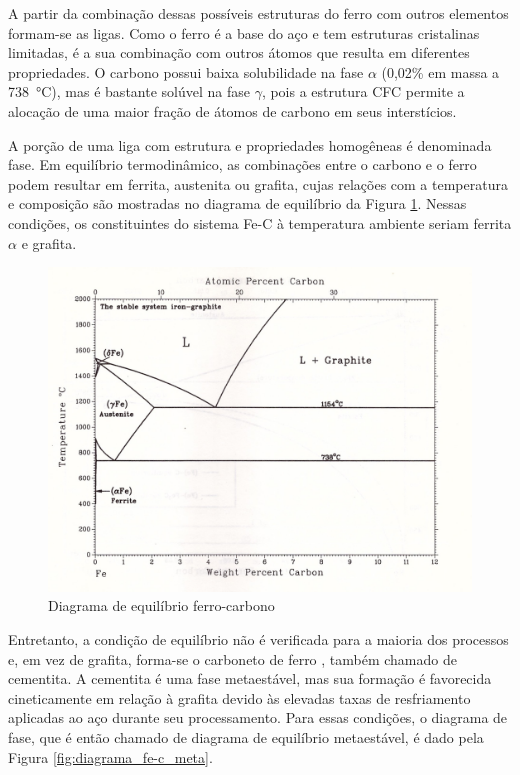\documentclass[brazil,tf,epusp]{usp}  %
\begin{document}
A partir da combinação dessas possíveis estruturas do ferro com outros elementos formam-se as ligas. Como o ferro é a base do aço e tem estruturas cristalinas limitadas, é a sua combinação com outros átomos que resulta em diferentes propriedades. O carbono possui baixa solubilidade na fase $\alpha$ (0,02\% em massa a 738~°C), mas é bastante solúvel na fase $\gamma$, pois a estrutura CFC permite a alocação de uma maior fração de átomos de carbono em seus interstícios.

A porção de uma liga com estrutura e propriedades homogêneas é denominada fase. Em equilíbrio termodinâmico, as combinações entre o carbono e o ferro podem resultar em ferrita, austenita ou grafita, cujas relações com a temperatura e composição são mostradas no diagrama de equilíbrio da Figura \ref{fig:diagrama_fe-c}. Nessas condições, os constituintes do sistema Fe-C à temperatura ambiente seriam ferrita $\alpha$ e grafita.

\begin{figure}[ht!]
  \includegraphics[width=.8\textwidth,angle=180]{img/Fe-C.jpg}
  \caption{Diagrama de equilíbrio ferro-carbono \cite{Massalski1996v1}}
  \label{fig:diagrama_fe-c}
\end{figure}

Entretanto, a condição de equilíbrio não é verificada para a maioria dos processos e, em vez de grafita, forma-se o carboneto de ferro , também chamado de cementita. A cementita é uma fase metaestável, mas sua formação é favorecida cineticamente em relação à grafita devido às elevadas taxas de resfriamento aplicadas ao aço durante seu processamento.
Para essas condições, o diagrama de fase, que é então chamado de diagrama de equilíbrio metaestável, é dado pela Figura \ref{fig:diagrama_fe-c_meta}.
\end{document}

